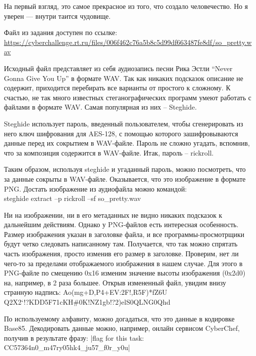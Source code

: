 
На первый взгляд, это самое прекрасное из того, что создало человечество. Но я уверен — внутри таится чудовище.

Файл из задания доступен по ссылке: \url{https://cyberchallenge.rt.ru/files/006f462c76a5b8c5d99df663487fe8df/so_pretty.wav}

\solutionSection

Исходный файл представляет из себя аудиозапись песни Рика Эстли “Never Gonna Give You Up” в формате WAV. Так как никаких подсказок описание не содержит, приходится перебирать все варианты от простого к сложному. К счастью, не так много известных стеганографических программ умеют работать с файлами в формате WAV. Самая популярная из них – Steghide.

Steghide использует пароль, введенный пользователем, чтобы сгенерировать из него ключ шифрования для AES-128, с помощью которого зашифровываются данные перед их сокрытием в WAV-файле. Пароль не сложно угадать, вспомнив, что за композиция содержится в WAV-файле. Итак, пароль – rickroll.


Таким образом, используя steghide и угаданный пароль, можно посмотреть, что за данные сокрыты в WAV-файле. Оказывается, что это изображение в формате PNG. Достать изображение из аудиофайла можно командой:\\
steghide extract –p rickroll –sf so\_pretty.wav

Ни на изображении, ни в его метаданных не видно никаких подсказок к дальнейшим действиям. Однако у PNG-файлов есть интересная особенность. Размер изображения указан в заголовке файла, и все программы-просмотрщики будут четко следовать написанному там. Получается, что так можно спрятать часть изображения, просто изменив его размер в заголовке. Проверим, нет ли чего-то за пределами отображаемого изображения в нашем случае. Для этого в PNG-файле по смещению 0x16 изменим значение высоты изображения (0x2d0) на, например, в 2 раза большее. Открыв измененный файл, увидим внизу странную надпись: 
Ao(mg+D,P4+EV:2F!,R5F)*fZ6U\\Q2X2`!?KDD5F71cKH\#0K!NZ1gb!?2)elS0QLNG0Qhd

По используемому алфавиту, можно догадаться, что это данные в кодировке Base85. Декодировать данные можно, например, онлайн сервисом CyberChef, получив в результате фразу:
|flag for this task: CC{57364n0_m47ry05hk4_ju57_f0r_y0u}|


